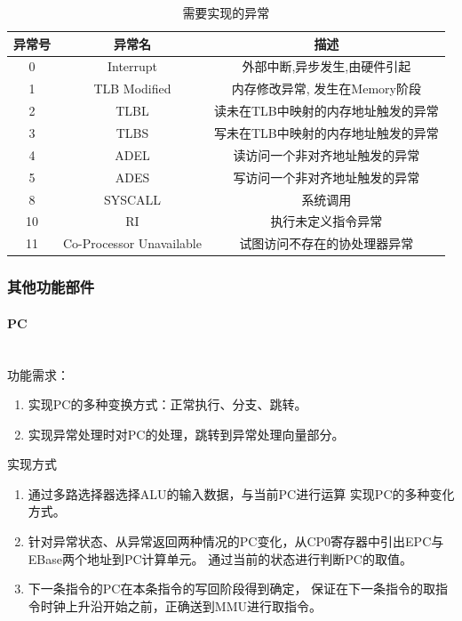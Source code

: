             \begin{table}
            \centering
            \caption{需要实现的异常}
            \begin{tabular}{|c|c|c|}
            \hline
            异常号 & 异常名 & 描述 \\
            \hline
            0 & Interrupt & 外部中断,异步发生,由硬件引起 \\
            \hline
            1 & TLB Modified & 内存修改异常, 发生在Memory阶段 \\
            \hline
            2 & TLBL & 读未在TLB中映射的内存地址触发的异常 \\
            \hline
            3 & TLBS & 写未在TLB中映射的内存地址触发的异常 \\
            \hline
            4 & ADEL & 读访问一个非对齐地址触发的异常 \\
            \hline
            5 & ADES & 写访问一个非对齐地址触发的异常 \\
            \hline
            8 & SYSCALL & 系统调用 \\
            \hline
            10 & RI & 执行未定义指令异常 \\
            \hline
            11 & Co-Processor Unavailable & 试图访问不存在的协处理器异常 \\
            \hline
            \end{tabular}
            \end{table}

        \subsubsection{其他功能部件}
            \paragraph{PC}
                \mbox{} \\ 

                功能需求：
                \begin{enumerate}
                \item
                实现PC的多种变换方式：正常执行、分支、跳转。
                \item
                实现异常处理时对PC的处理，跳转到异常处理向量部分。
                \end{enumerate}

                实现方式
                \begin{enumerate}
                \item
                通过多路选择器选择ALU的输入数据，与当前PC进行运算%
                实现PC的多种变化方式。
                \item
                针对异常状态、从异常返回两种情况的PC变化，从CP0寄存器中引出EPC与EBase两个地址到PC计算单元。
                通过当前的状态进行判断PC的取值。
                \item
                下一条指令的PC在本条指令的写回阶段得到确定，
                保证在下一条指令的取指令时钟上升沿开始之前，正确送到MMU进行取指令。
                \end{enumerate}

